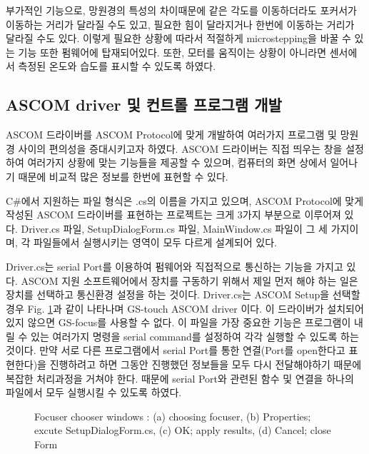 부가적인 기능으로, 망원경의 특성의 차이때문에 같은 각도를 이동하더라도 포커서가 이동하는 거리가 달라질 수도 있고, 필요한 힘이 달라지거나 한번에 이동하는 거리가 달라질 수도 있다. 이렇게 필요한 상황에 따라서 적절하게 microstepping을 바꿀 수 있는 기능 또한 펌웨어에 탑재되어있다. 또한, 모터를 움직이는 상황이 아니라면 센서에서 측정된 온도와 습도를 표시할 수 있도록 하였다.

\subsection{ASCOM driver 및 컨트롤 프로그램 개발}

ASCOM 드라이버를 ASCOM Protocol에 맞게 개발하여 여러가지 프로그램 및 망원경 사이의 편의성을 증대시키고자 하였다. ASCOM 드라이버는 직접 띄우는 창을 설정하여 여러가지 상황에 맞는 기능들을 제공할 수 있으며, 컴퓨터의 화면 상에서 일어나기 때문에 비교적 많은 정보를 한번에 표현할 수 있다.

C\#에서 지원하는 파일 형식은 .cs의 이름을 가지고 있으며, ASCOM Protocol에 맞게 작성된 ASCOM 드라이버를 표현하는 프로젝트는 크게 3가지 부분으로 이루어져 있다. Driver.cs 파일, SetupDialogForm.cs 파일, MainWindow.cs 파일이 그 세 가지이며, 각 파일들에서 실행시키는 영역이 모두 다르게 설계되어 있다.

Driver.cs는 serial Port를 이용하여 펌웨어와 직접적으로 통신하는 기능을 가지고 있다. ASCOM 지원 소프트웨어에서 장치를 구동하기 위해서 제일 먼저 해야 하는 일은 장치를 선택하고 통신환경 설정을 하는 것이다. Driver.cs는 ASCOM Setup을 선택할 경우 Fig. \ref{fig:focuserchooser}과 같이 나타나며 GS-touch ASCOM driver 이다. 이 드라이버가 설치되어 있지 않으면 GS-focus를 사용할 수 없다. 이 파일을 가장 중요한 기능은 프로그램이 내릴 수 있는 여러가지 명령을 serial command를 설정하여 각각 실행할 수 있도록 하는 것이다. 만약 서로 다른 프로그램에서 serial Port를 통한 연결(Port를 open한다고 표현한다)을 진행하려고 하면 그동안 진행했던 정보들을 모두 다시 전달해야하기 때문에 복잡한 처리과정을 거쳐야 한다. 때문에 serial Port와 관련된 함수 및 연결을 하나의 파일에서 모두 실행시킬 수 있도록 하였다.

\begin{figure}[h]
	\begin{center}
	\end{center}
	\caption{Focuser chooser windows : (a) choosing focuser, (b) Properties; excute SetupDialogForm.cs, (c) OK; apply results, (d) Cancel; close Form}
\label{fig:focuserchooser}	
\end{figure}

